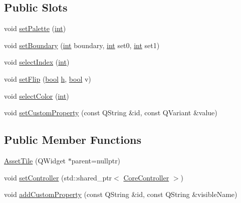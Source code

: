 \subsection*{Public Slots}
\begin{DoxyCompactItemize}
\item 
void \mbox{\hyperlink{class_q_g_b_a_1_1_asset_tile_ae6edb2008ce1ff20223ae29193765a72}{set\+Palette}} (\mbox{\hyperlink{ioapi_8h_a787fa3cf048117ba7123753c1e74fcd6}{int}})
\item 
void \mbox{\hyperlink{class_q_g_b_a_1_1_asset_tile_aa1b96aa339372554405980e63a82cb98}{set\+Boundary}} (\mbox{\hyperlink{ioapi_8h_a787fa3cf048117ba7123753c1e74fcd6}{int}} boundary, \mbox{\hyperlink{ioapi_8h_a787fa3cf048117ba7123753c1e74fcd6}{int}} set0, \mbox{\hyperlink{ioapi_8h_a787fa3cf048117ba7123753c1e74fcd6}{int}} set1)
\item 
void \mbox{\hyperlink{class_q_g_b_a_1_1_asset_tile_a737edc8b5a7ef139126277fb7a3a4400}{select\+Index}} (\mbox{\hyperlink{ioapi_8h_a787fa3cf048117ba7123753c1e74fcd6}{int}})
\item 
void \mbox{\hyperlink{class_q_g_b_a_1_1_asset_tile_ae4996f927c74eeb6759eb0f3b77acd0d}{set\+Flip}} (\mbox{\hyperlink{libretro_8h_a4a26dcae73fb7e1528214a068aca317e}{bool}} \mbox{\hyperlink{isa-lr35902_8c_a06a62682361411df32cf88f75a0b8da4}{h}}, \mbox{\hyperlink{libretro_8h_a4a26dcae73fb7e1528214a068aca317e}{bool}} v)
\item 
void \mbox{\hyperlink{class_q_g_b_a_1_1_asset_tile_af49cc943f4c92d78aa58bd33559a7618}{select\+Color}} (\mbox{\hyperlink{ioapi_8h_a787fa3cf048117ba7123753c1e74fcd6}{int}})
\item 
void \mbox{\hyperlink{class_q_g_b_a_1_1_asset_tile_a6e1643078cf669ece8a87799b7ed5cfa}{set\+Custom\+Property}} (const Q\+String \&id, const Q\+Variant \&value)
\end{DoxyCompactItemize}
\subsection*{Public Member Functions}
\begin{DoxyCompactItemize}
\item 
\mbox{\hyperlink{class_q_g_b_a_1_1_asset_tile_a2c8f107c95eeae23603d368ed884b05a}{Asset\+Tile}} (Q\+Widget $\ast$parent=nullptr)
\item 
void \mbox{\hyperlink{class_q_g_b_a_1_1_asset_tile_ae8f4c831a1523553c63c5c293e04fa1d}{set\+Controller}} (std\+::shared\+\_\+ptr$<$ \mbox{\hyperlink{class_q_g_b_a_1_1_core_controller}{Core\+Controller}} $>$)
\item 
void \mbox{\hyperlink{class_q_g_b_a_1_1_asset_tile_a30512179dd4da3642458aa395daad9ca}{add\+Custom\+Property}} (const Q\+String \&id, const Q\+String \&visible\+Name)
\end{DoxyCompactItemize}
